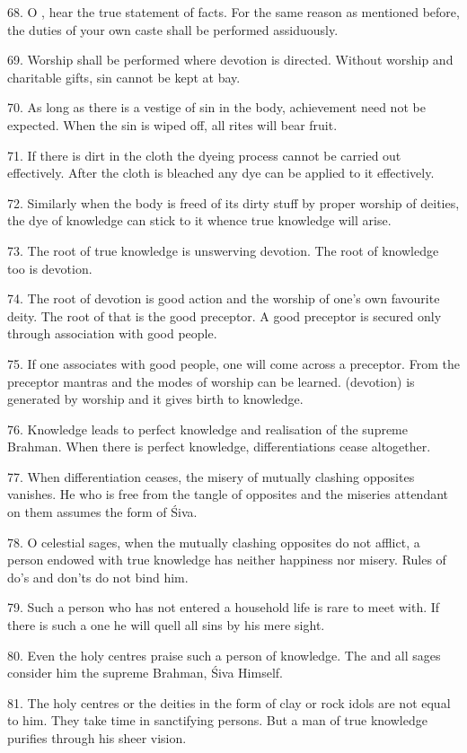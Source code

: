 68. O , hear the true statement of facts. For the same reason as
mentioned before, the duties of your own caste shall be performed assiduously.

69. Worship shall be performed where devotion is directed. Without worship and
charitable gifts, sin cannot be kept at bay.

70. As long as there is a vestige of sin in the body, achievement need not be
expected. When the sin is wiped off, all rites will bear fruit.

71. If there is dirt in the cloth the dyeing process cannot be carried out
effectively. After the cloth is bleached any dye can be applied to it
effectively.

72. Similarly when the body is freed of its dirty stuff by proper worship of
deities, the dye of knowledge can stick to it whence true knowledge will arise.

73. The root of true knowledge is unswerving devotion. The root of knowledge too
is devotion.

74. The root of devotion is good action and the worship of one’s own favourite
deity. The root of that is the good preceptor. A good preceptor is secured only
through association with good people.

75. If one associates with good people, one will come across a preceptor. From
the preceptor mantras and the modes of worship can be learned. 
(devotion) is generated by worship and it gives birth to knowledge.

76. Knowledge leads to perfect knowledge and realisation of the supreme Brahman.
When there is perfect knowledge, differentiations cease altogether.

77. When differentiation ceases, the misery of mutually clashing opposites
vanishes. He who is free from the tangle of opposites and the miseries attendant
on them assumes the form of Śiva.

78. O celestial sages, when the mutually clashing opposites do not afflict,
a person endowed with true knowledge has neither happiness nor misery. Rules of
do’s and don’ts do not bind him.

79. Such a person who has not entered a household life is rare to meet with. If
there is such a one he will quell all sins by his mere sight.

80. Even the holy centres praise such a person of knowledge. The  and
all sages consider him the supreme Brahman, Śiva Himself.

81. The holy centres or the deities in the form of clay or rock idols are not
equal to him. They take time in sanctifying persons. But a man of true knowledge
purifies through his sheer vision.

